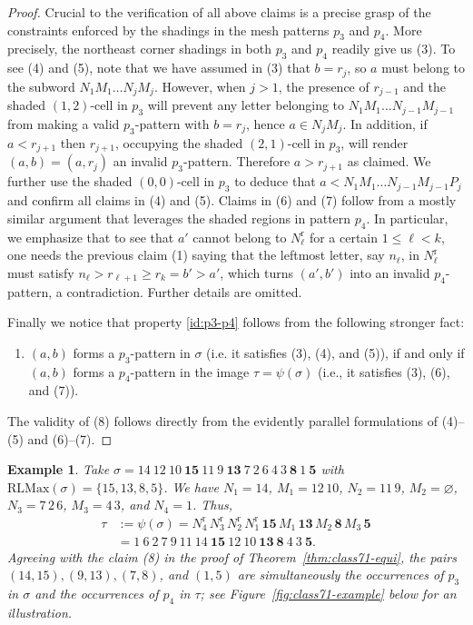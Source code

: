 \documentclass[12pt]{article}
\newtheorem{example}[thm]{Example}
\def\rr{\mathrm{r}}
\def\RLM{\mathrm{RLMax}}
\begin{document}
\begin{proof}
  Crucial to the verification of all above claims is a precise grasp of the constraints enforced by the shadings in the mesh patterns $p_3$ and $p_4$. More precisely, the northeast corner shadings in both $p_3$ and $p_4$ readily give us (3). To see (4) and (5), note that we have assumed in (3) that $b=r_j$, so $a$ must belong to the subword $N_1M_1\ldots N_jM_j$. However, when $j>1$, the presence of $r_{j-1}$ and the shaded $(1,2)$-cell in $p_3$ will prevent any letter belonging to $N_1M_1\ldots N_{j-1}M_{j-1}$ from making a valid $p_3$-pattern with $b=r_j$, hence $a\in N_jM_j$. In addition, if $a<r_{j+1}$ then $r_{j+1}$, occupying the shaded $(2,1)$-cell in $p_3$, will render $(a,b)=(a,r_j)$ an invalid $p_3$-pattern. Therefore $a>r_{j+1}$ as claimed. We further use the shaded $(0,0)$-cell in $p_3$ to deduce that $a<N_1M_1\ldots N_{j-1}M_{j-1}P_j$ and confirm all claims in (4) and (5). Claims in (6) and (7) follow from a mostly similar argument that leverages the shaded regions in pattern $p_4$. In particular, we emphasize that to see that $a'$ cannot belong to $N^{\rr}_{\ell}$ for a certain $1\le \ell <k$, one needs the previous claim (1) saying that the leftmost letter, say $n_{\ell}$, in $N^{\rr}_{\ell}$ must satisfy $n_{\ell}>r_{\ell+1}\ge r_k=b'>a'$, which turns $(a',b')$ into an invalid $p_4$-pattern, a contradiction. Further details are omitted. 

  Finally we notice that property \eqref{id:p3-p4} follows from the following stronger fact:
\begin{enumerate}[label=(\arabic*), resume]
   \item $(a,b)$ forms a $p_3$-pattern in $\sigma$ (i.e. it satisfies (3), (4), and (5)), if and only if $(a,b)$ forms a $p_4$-pattern in the image $\tau=\psi(\sigma)$ (i.e., it satisfies (3), (6), and (7)).
\end{enumerate}
The validity of (8) follows directly from the evidently parallel formulations of (4)--(5) and (6)--(7).
\end{proof}


\begin{example}\label{eg:psi}
	Take $\sigma= 14~12~10~\mathbf{15}~11~9~\mathbf{13}~7~2~6~4~3~\mathbf{8}~1~\mathbf{5}$ with $\RLM(\sigma)=\{15,13,8,5\}$. We have $N_1=14$, $M_1=12\,10$, $N_2=11\,9$, $M_2=\varnothing$, $N_3=7\,2\,6$, $M_3=4\,3$, and $N_4=1$. Thus,
  \begin{align*}
  \tau &:=\psi(\sigma) = N^{\rr}_4\,N^{\rr}_3\,N^{\rr}_2\,N^{\rr}_1\,\mathbf{15}\,M_1\,\mathbf{13}\,M_2\,\mathbf{8}\,M_3\,\mathbf{5}\\
  &=1~6~2~7~9~11~14~\mathbf{15}~12~10~\mathbf{13}~\mathbf{8}~4~3~\mathbf{5}.
  \end{align*} 
  Agreeing with the claim (8) in the proof of Theorem~\ref{thm:class71-equi}, the pairs $(14,15), (9,13), (7,8)$, and $(1,5)$ are simultaneously the occurrences of $p_3$ in $\sigma$ and the occurrences of $p_4$ in $\tau$; see Figure~\ref{fig:class71-example} below for an illustration.
\end{example}
 
\end{document}

